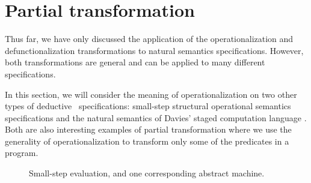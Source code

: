 \section{Partial transformation}
\label{sec:othertransform}

Thus far, we have only discussed the application of the
operationalization and defunctionalization transformations to natural
semantics specifications. However, both transformations are general
and can be applied to many different specifications. 

In this section, we will consider the meaning of
operationalization on two other types of deductive
\sls~specifications: small-step structural operational semantics
specifications and the natural semantics of Davies' staged computation
language \rowan. Both are also interesting examples of partial
transformation where we use the generality of operationalization
to transform only some of the predicates in a program.






\begin{figure}[tp]
\begin{minipage}[b]{0.450\linewidth}
\end{minipage}
\hspace{0.5cm}
\begin{minipage}[b]{0.50\linewidth}
\end{minipage}
\caption{Small-step evaluation, and one corresponding abstract machine.}
\label{fig:cbv-sos}
\end{figure}

